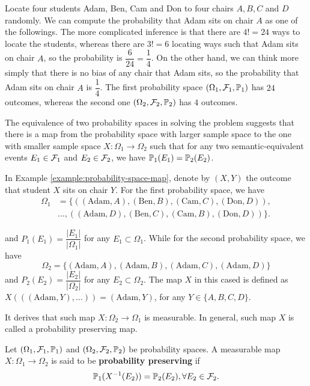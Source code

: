 \begin{example}
  \label{example:probability-space-map}
  Locate four students Adam, Ben, Cam and Don to four chairs $A,B,C$ and $D$ randomly. We can compute the probability that Adam sits on chair $A$ as one of the followings. The more complicated inference is that there are $4! = 24$ ways to locate the students, whereas there are $3! = 6$ locating ways such that Adam sits on chair $A$, so the probability is $\dfrac{6}{24}=\dfrac{1}{4}$. On the other hand, we can think more simply that there is no bias of any chair that Adam sits, so the probability that Adam sits on chair $A$ is $\dfrac{1}{4}$. The first probability space $(\Omega_1, \mathcal{F}_1, \mathbb{P}_1)$ has $24$ outcomes, whereas the second one $(\Omega_2, \mathcal{F}_2, \mathbb{P}_2)$ has $4$ outcomes.
\end{example}

The equivalence of two probability spaces in solving the problem suggests that there is a map from the probability space with larger sample space to the one with smaller sample space $X : \Omega_1 \to \Omega_2$ such that for any two semantic-equivalent events $E_1\in\mathcal{F}_1$ and $E_2\in\mathcal{F}_2$, we have $\mathbb{P}_1(E_1) = \mathbb{P}_2(E_2)$.

\begin{example}
  In Example \ref{example:probability-space-map}, denote by $(X,Y)$ the outcome that student $X$ sits on chair $Y$. For the first probability space, we have
  \begin{align*}
    \Omega_1
     & =\{((\text{Adam}, A), (\text{Ben}, B), (\text{Cam}, C), (\text{Don}, D)),        \\
     & \ldots, ((\text{Adam}, D), (\text{Ben}, C), (\text{Cam}, B), (\text{Don}, D))\}.
  \end{align*}

  and $P_1(E_1) = \dfrac{|E_1|}{|\Omega_1|}$ for any $E_1\subset \Omega_1$. While for the second probability space, we have
  $$\Omega_2=\{(\text{Adam}, A), (\text{Adam}, B), (\text{Adam}, C), (\text{Adam}, D)\}$$
  and $P_2(E_2) = \dfrac{|E_2|}{|\Omega_2|}$ for any $E_2\subset \Omega_2$.
  The map $X$ in this cased is defined as $X(((\text{Adam}, Y), \ldots)) = (\text{Adam}, Y)$, for any $Y\in\{A,B,C,D\}$.
\end{example}

It derives that such map $X : \Omega_2 \to \Omega_1$ is measurable. In general, such map $X$ is called a probability preserving map.

\begin{definition}
  Let $(\Omega_1, \mathcal{F}_1, \mathbb{P}_1)$ and $(\Omega_2, \mathcal{F}_2, \mathbb{P}_2)$ be probability spaces. A measurable map $X : \Omega_1 \to \Omega_2$ is said to be \textbf{probability preserving} if
  $$\mathbb{P}_1(X^{-1}(E_2)) = \mathbb{P}_2(E_2), \forall E_2 \in \mathcal{F}_2.$$
\end{definition}

